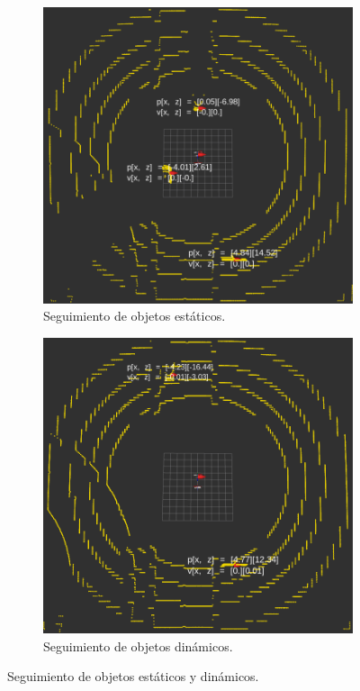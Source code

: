 \begin{figure}[h]
    \centering
    \begin{subfigure}[b]{0.4\textwidth}
         \centering
         \includegraphics[width=\textwidth]{Figures/Figures_Cap05/object_tracking_static.png}
         \caption{Seguimiento de objetos estáticos.}
         \label{fig:object_tracking_static}
    \end{subfigure}
    \hfill
    \begin{subfigure}[b]{0.4\textwidth}
         \centering
         \includegraphics[width=\textwidth]{Figures/Figures_Cap05/object_tracking_dynamic.png}
         \caption{Seguimiento de objetos dinámicos.}
         \label{fig:object_tracking_dynamic}
     \end{subfigure}
     
    \caption{Seguimiento de objetos estáticos y dinámicos.}
    \label{fig:object_detect_tracking}
\end{figure}
\newpage


